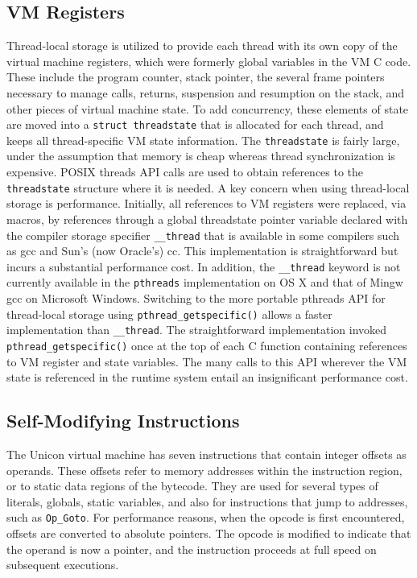 \subsection{VM Registers}
Thread-local storage is utilized to provide each thread with its own copy
of the virtual machine registers, which were formerly global variables in
the VM C code. These include the program counter, stack pointer, the
several frame pointers necessary to manage calls, returns, suspension and
resumption on the stack, and other pieces of virtual machine state.  To add
concurrency, these elements of state are moved into a \texttt{struct
  threadstate} that is allocated for each thread, and keeps all
thread-specific VM state information.  The \texttt{threadstate} is fairly
large, under the assumption that memory is cheap whereas thread
synchronization is expensive. POSIX threads API calls are used to obtain
references to the \texttt{threadstate} structure where it is needed.  A key
concern when using thread-local storage is performance. Initially, all
references to VM registers were replaced, via macros, by references through
a global threadstate pointer variable declared with the compiler storage
specifier \texttt{\_\_thread} that is available in some compilers such as
gcc and Sun's (now Oracle's) cc. This implementation is straightforward but
incurs a substantial performance cost. In addition, the \texttt{\_\_thread}
keyword is not currently available in the \texttt{pthreads} implementation
on OS X and that of Mingw gcc on Microsoft Windows.  Switching to the more
portable pthreads API for thread-local storage using
\texttt{pthread\_getspecific()} allows a faster implementation than
\texttt{\_\_thread}. The straightforward implementation invoked
\texttt{pthread\_getspecific()} once at the top of each C function
containing references to VM register and state variables. The many calls to
this API wherever the VM state is referenced in the runtime system entail
an insignificant performance cost.

\subsection{Self-Modifying Instructions}
The Unicon virtual machine has seven instructions that contain integer
offsets as operands.  These offsets refer to memory addresses within the
instruction region, or to static data regions of the bytecode. They are
used for several types of literals, globals, static variables, and also for
instructions that jump to addresses, such as \texttt{Op\_Goto}. For
performance reasons, when the opcode is first encountered, offsets are
converted to absolute pointers.  The opcode is modified to indicate that
the operand is now a pointer, and the instruction proceeds at full speed on
subsequent executions.

